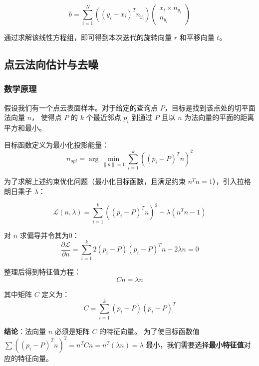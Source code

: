 \documentclass[12pt]{article}
\begin{document}
\begin{equation}
    b = \sum_{i=1}^{N} \left( (y_i - x_i)^T n_{y_i} \right) 
    \begin{pmatrix} 
    x_i \times n_{y_i} \\ 
    n_{y_i} 
    \end{pmatrix}
\end{equation}

通过求解该线性方程组，即可得到本次迭代的旋转向量 $r$ 和平移向量 $t$。

\subsection{点云法向估计与去噪}

\subsubsection{数学原理}
假设我们有一个点云表面样本。对于给定的查询点 $P$，目标是找到该点处的切平面法向量 $n$，
使得点 $P$ 的 $k$ 个最近邻点 $p_i$ 到通过 $P$ 且以 $n$ 为法向量的平面的距离平方和最小。

目标函数定义为最小化投影能量：
\begin{equation}
    n_{opt} = \arg \min_{\|n\|=1} \sum_{i=1}^{k} \left( (p_i - P)^T n \right)^2
\end{equation}

为了求解上述约束优化问题（最小化目标函数，且满足约束 $n^T n = 1$），引入拉格朗日乘子 $\lambda$：

\begin{equation}
    \mathcal{L}(n, \lambda) = \sum_{i=1}^{k} \left( (p_i - P)^T n \right)^2 - \lambda (n^T n - 1)
\end{equation}

对 $n$ 求偏导并令其为0：
\begin{equation}
    \frac{\partial \mathcal{L}}{\partial n} = \sum_{i=1}^{k} 2 (p_i - P)(p_i - P)^T n - 2 \lambda n = 0
\end{equation}

整理后得到特征值方程：
\begin{equation}
    C n = \lambda n
\end{equation}

其中矩阵 $C$ 定义为：
\begin{equation}
    C = \sum_{i=1}^{k} (p_i - P)(p_i - P)^T
\end{equation}

\textbf{结论}：法向量 $n$ 必须是矩阵 $C$ 的特征向量。
为了使目标函数值 $\sum ((p_i - P)^T n)^2 = n^T C n = n^T (\lambda n) = \lambda$ 最小，我们需要选择\textbf{最小特征值}对应的特征向量。
\end{document}
